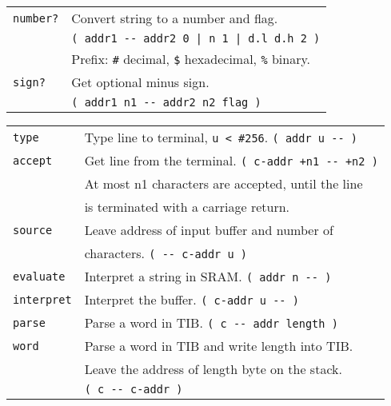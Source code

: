 \documentclass[10pt,landscape,a4paper]{article}
\begin{document}
\begin{multicols}{3}
\begin{tabular}{@{}ll@{}}
\verb!number?!  & Convert string to a number and flag. \\
                & \verb!( addr1 -- addr2 0 | n 1 | d.l d.h 2 )! \\
                & Prefix: \verb!#! decimal, \verb!$! hexadecimal, \verb!%! binary.\\
\verb!sign?!  & Get optional minus sign. \\
              & \verb!( addr1 n1 -- addr2 n2 flag )!\\
\end{tabular}
\begin{tabular}{@{}ll@{}}
\verb!type!  & Type line to terminal, \verb!u < #256!. \verb!( addr u -- )! \\
\verb!accept! & Get line from the terminal. \verb!( c-addr +n1 -- +n2 )! \\
              & At most n1 characters are accepted, until the line \\
              & is terminated with a carriage return. \\
\verb!source! & Leave address of input buffer and number of \\
              & characters.  \verb!( -- c-addr u )! \\
\verb!evaluate! & Interpret a string in SRAM. \verb!( addr n -- )! \\
\verb!interpret! & Interpret the buffer. \verb!( c-addr u -- )! \\
\verb!parse! & Parse a word in TIB. \verb!( c -- addr length )! \\
\verb!word! & Parse a word in TIB and write length into TIB. \\
            & Leave the address of length byte on the stack. \\
            & \verb!( c -- c-addr )! \\
\end{tabular}

\medskip


\end{multicols}
\end{document}
